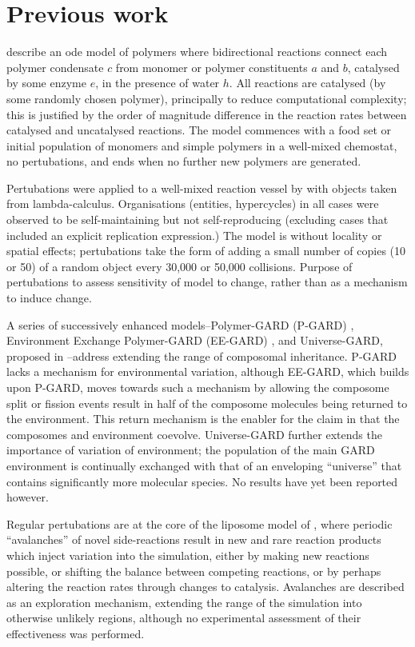 \section{Previous work}



\Textcite{Farmer1986} describe an \gls{ode} model of polymers where bidirectional reactions connect each polymer condensate $c$ from monomer or polymer constituents $a$ and $b$, catalysed by some enzyme $e$, in the presence of water $h$. All reactions are catalysed (by some randomly chosen polymer), principally to reduce computational complexity; this is justified by the order of magnitude difference in the reaction rates between catalysed and uncatalysed reactions.  The model commences with a food set or initial population of monomers and simple polymers in a well-mixed chemostat, no pertubations, and ends when no further new polymers are generated.

Pertubations were applied to a well-mixed reaction vessel by \textcite{Fontana1994a} with objects taken from lambda-calculus. Organisations (entities, \glspl{hypercycle}) in all cases were observed to be self-maintaining but not self-reproducing (excluding cases that included an explicit replication expression.) The model is without locality or spatial effects; pertubations take the form of adding a small number of copies (10 or 50) of a random object every 30,000 or 50,000 collisions. Purpose of pertubations to assess sensitivity of model to change, rather than as a mechanism to induce change. 

A series of successively enhanced models--Polymer-GARD (P-GARD) \parencite{Shenhav2005}, Environment Exchange Polymer-GARD (EE-GARD) \parencite{Shenhav2007}, and Universe-GARD, proposed in \cite{Markovitch2012}--address extending the range of composomal inheritance. P-GARD lacks a mechanism for environmental variation, although EE-GARD, which builds upon P-GARD, moves towards such a mechanism by allowing the composome split or fission events result in half of the composome molecules being returned to the environment. This return mechanism is the enabler for the claim in \textcite[p1819]{Shenhav2007} that the composomes and environment coevolve. Universe-GARD further extends the importance of variation of environment; the population of the main GARD environment is continually exchanged with that of an enveloping ``universe'' that contains significantly more molecular species. No results have yet been reported however.

Regular pertubations are at the core of the liposome model of \textcite{Fernando:2007pf}, where periodic ``avalanches'' of novel side-reactions result in new and rare reaction products which inject variation into the simulation, either by making new reactions possible, or shifting the balance between competing reactions, or by perhaps altering the reaction rates through changes to catalysis. Avalanches are described as an exploration mechanism, extending the range of the simulation into otherwise unlikely regions, although no experimental assessment of their effectiveness was performed.

